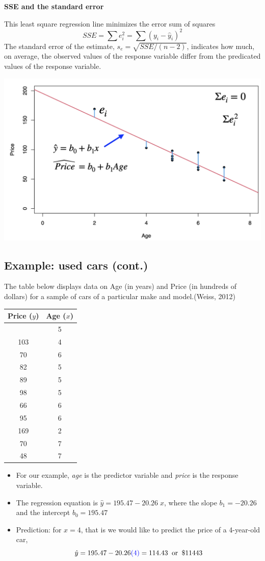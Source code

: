 \documentclass[
]{article}
\begin{document}
\textbf{SSE and the standard error}

This least square regression line minimizes the error sum of squares
\[SSE=\sum e^2_i =\sum (y_i-\hat{y}_i)^2\] The standard error of the
estimate, \(s_e=\sqrt{SSE/(n-2)}\), indicates how much, on average, the
observed values of the response variable differ from the predicated
values of the response variable.

\begin{center}\includegraphics[width=0.6\linewidth,height=0.6\textheight]{figures/leastsq1} \end{center}

\hypertarget{example-used-cars-cont.}{%
\subsection{Example: used cars (cont.)}\label{example-used-cars-cont.}}

The table below displays data on Age (in years) and Price (in hundreds
of dollars) for a sample of cars of a particular make and model.(Weiss,
2012)

\begin{longtable}[]{@{}cc@{}}
\toprule\noalign{}
Price (\(y\)) & Age (\(x\)) \\
\midrule\noalign{}
\endhead
\bottomrule\noalign{}
\endlastfoot
85 & 5 \\
103 & 4 \\
70 & 6 \\
82 & 5 \\
89 & 5 \\
98 & 5 \\
66 & 6 \\
95 & 6 \\
169 & 2 \\
70 & 7 \\
48 & 7 \\
\end{longtable}

\begin{itemize}
\item
  For our example, \emph{age} is the predictor variable and \emph{price}
  is the response variable.
\item
  The regression equation is \(\hat{y}=195.47-20.26\;x\), where the
  slope \(b_1=-20.26\) and the intercept \(b_0=195.47\)
\item
  Prediction: for \(x = 4\), that is we would like to predict the price
  of a 4-year-old car,
  \[\hat{y}=195.47-20.26 {\color{blue}(4)}= 114.43 \;\;\text{or}\;\; \$ 11443\]
\end{itemize}
\end{document}
